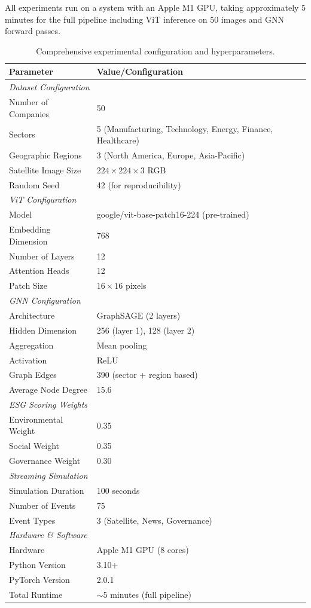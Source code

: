 All experiments run on a system with an Apple M1 GPU, taking approximately 5 minutes for the full pipeline including ViT inference on 50 images and GNN forward passes.

\begin{table}[h!]
\centering
\small
 \begin{tabular}{l l}
 \hline
 \textbf{Parameter} & \textbf{Value/Configuration} \\ [0.5ex]
 \hline
 \multicolumn{2}{l}{\textit{Dataset Configuration}} \\
 Number of Companies & 50 \\
 Sectors & 5 (Manufacturing, Technology, Energy, Finance, Healthcare) \\
 Geographic Regions & 3 (North America, Europe, Asia-Pacific) \\
 Satellite Image Size & $224 \times 224 \times 3$ RGB \\
 Random Seed & 42 (for reproducibility) \\
 \hline
 \multicolumn{2}{l}{\textit{ViT Configuration}} \\
 Model & google/vit-base-patch16-224 (pre-trained) \\
 Embedding Dimension & 768 \\
 Number of Layers & 12 \\
 Attention Heads & 12 \\
 Patch Size & $16 \times 16$ pixels \\
 \hline
 \multicolumn{2}{l}{\textit{GNN Configuration}} \\
 Architecture & GraphSAGE (2 layers) \\
 Hidden Dimension & 256 (layer 1), 128 (layer 2) \\
 Aggregation & Mean pooling \\
 Activation & ReLU \\
 Graph Edges & 390 (sector + region based) \\
 Average Node Degree & 15.6 \\
 \hline
 \multicolumn{2}{l}{\textit{ESG Scoring Weights}} \\
 Environmental Weight & 0.35 \\
 Social Weight & 0.35 \\
 Governance Weight & 0.30 \\
 \hline
 \multicolumn{2}{l}{\textit{Streaming Simulation}} \\
 Simulation Duration & 100 seconds \\
 Number of Events & 75 \\
 Event Types & 3 (Satellite, News, Governance) \\
 \hline
 \multicolumn{2}{l}{\textit{Hardware \& Software}} \\
 Hardware & Apple M1 GPU (8 cores) \\
 Python Version & 3.10+ \\
 PyTorch Version & 2.0.1 \\
 Total Runtime & $\sim$5 minutes (full pipeline) \\
 \hline
 \end{tabular}
 \caption{\label{tab:exp_setup}Comprehensive experimental configuration and hyperparameters.}
\end{table}

